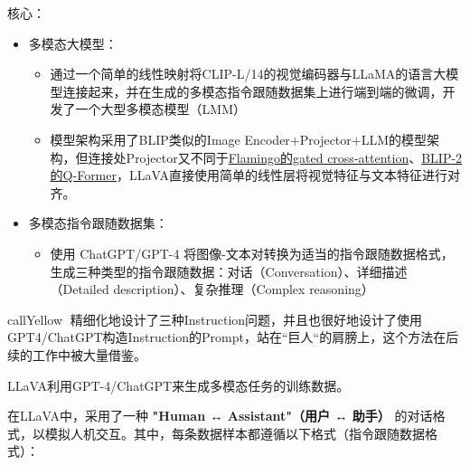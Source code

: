 \documentclass[zihao=false,fontset=windows]{ctexart}
\begin{document}
\par\vspace{1.15em}\par\vspace{0.28em}

核心：\par
\begin{itemize}
\item 多模态大模型：
\begin{itemize}
\item 通过一个简单的线性映射将CLIP-L/14的视觉编码器与LLaMA的语言大模型连接起来，并在生成的多模态指令跟随数据集上进行端到端的微调，开发了一个大型多模态模型（LMM）
\item 模型架构采用了BLIP类似的Image Encoder+Projector+LLM的模型架构，但连接处Projector又不同于\href{https://scnajei2ds6y.feishu.cn/wiki/Cb61wEeXDi5NQSkARrbcu8PynEf\#V3VvdDiTuoIVyixgRcNcClO2nhc}{Flamingo的gated cross-attention}、\href{https://scnajei2ds6y.feishu.cn/wiki/AZiVwFmXEirI77kAVzYcOMNVnbh\#NAZtdozkGoFqMQxHJgKc9rCynbe}{BLIP-2的Q-Former}，LLaVA直接使用简单的线性层将视觉特征与文本特征进行对齐。
\end{itemize}
\item 多模态指令跟随数据集：
\begin{itemize}
\item 使用 ChatGPT/GPT-4 将图像-文本对转换为适当的指令跟随数据格式，生成三种类型的指令跟随数据：对话（Conversation）、详细描述（Detailed description）、复杂推理（Complex reasoning）
\end{itemize}
\end{itemize}

\par\vspace{1.15em}\par\vspace{0.28em}

\begin{feishubox}{callYellow}{🌟}
精细化地设计了三种Instruction问题，并且也很好地设计了使用GPT4/ChatGPT构造Instruction的Prompt，站在“巨人“的肩膀上，这个方法在后续的工作中被大量借鉴。\par
\end{feishubox}

LLaVA利用GPT-4/ChatGPT来生成多模态任务的训练数据。\par

在LLaVA中，采用了一种 \textbf{"Human ↔ Assistant"（用户 ↔ 助手）} 的对话格式，以模拟人机交互。其中，每条数据样本都遵循以下格式（指令跟随数据格式）：\par
\end{document}
